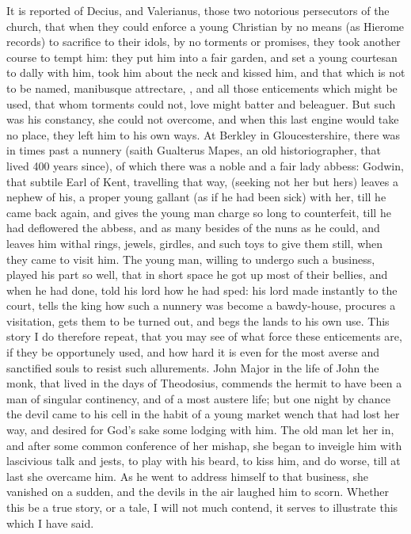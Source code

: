 It is reported of Decius, and Valerianus, those two notorious
persecutors of the church, that when they could enforce a young
Christian by no means (as Hierome records) to sacrifice to their
idols, by no torments or promises, they took another course to tempt
him: they put him into a fair garden, and set a young courtesan to
dally with him, took him about the neck and kissed him, and that
which is not to be named, manibusque attrectare, \etc{}, and all those
enticements which might be used, that whom torments could not, love
might batter and beleaguer. But such was his constancy, she could not
overcome, and when this last engine would take no place, they left him
to his own ways. At Berkley in Gloucestershire, there was in
times past a nunnery (saith Gualterus Mapes, an old historiographer,
that lived 400 years since), of which there was a noble and a fair lady
abbess: Godwin, that subtile Earl of Kent, travelling that way,
(seeking not her but hers) leaves a nephew of his, a proper young
gallant (as if he had been sick) with her, till he came back again, and
gives the young man charge so long to counterfeit, till he had
deflowered the abbess, and as many besides of the nuns as he could, and
leaves him withal rings, jewels, girdles, and such toys to give them
still, when they came to visit him. The young man, willing to undergo
such a business, played his part so well, that in short space he got up
most of their bellies, and when he had done, told his lord how he had
sped: his lord made instantly to the court, tells the king how
such a nunnery was become a bawdy-house, procures a visitation, gets
them to be turned out, and begs the lands to his own use. This story I
do therefore repeat, that you may see of what force these enticements
are, if they be opportunely used, and how hard it is even for the most
averse and sanctified souls to resist such allurements. John Major in
the life of John the monk, that lived in the days of Theodosius,
commends the hermit to have been a man of singular continency, and of a
most austere life; but one night by chance the devil came to his cell
in the habit of a young market wench that had lost her way, and desired
for God's sake some lodging with him. The old man let her in, and
after some common conference of her mishap, she began to inveigle him
with lascivious talk and jests, to play with his beard, to kiss him,
and do worse, till at last she overcame him. As he went to address
himself to that business, she vanished on a sudden, and the devils in
the air laughed him to scorn. Whether this be a true story, or a tale,
I will not much contend, it serves to illustrate this which I have
said.

